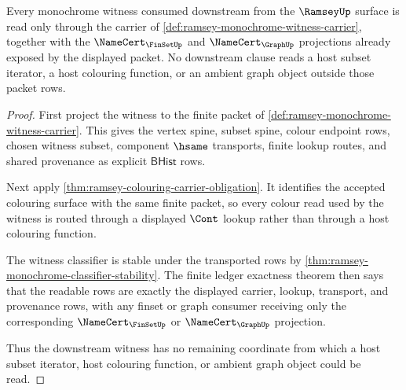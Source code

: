 \begin{theorem}
\label{thm:ramsey-monochrome-witness-scope}
Every monochrome witness consumed downstream from the $\RamseyUp$ surface is
read only through the carrier of
\autoref{def:ramsey-monochrome-witness-carrier}, together with the
$\NameCert_{\FinSetUp}$ and $\NameCert_{\GraphUp}$ projections already exposed
by the displayed packet. No downstream clause reads a host subset iterator, a
host colouring function, or an ambient graph object outside those packet rows.
\end{theorem}
\begin{proof}
First project the witness to the finite packet of
\autoref{def:ramsey-monochrome-witness-carrier}. This gives the vertex spine,
subset spine, colour endpoint rows, chosen witness subset, component
$\hsame$ transports, finite lookup routes, and shared provenance as explicit
$\mathsf{BHist}$ rows.

Next apply \autoref{thm:ramsey-colouring-carrier-obligation}. It identifies
the accepted colouring surface with the same finite packet, so every colour
read used by the witness is routed through a displayed $\Cont$ lookup rather
than through a host colouring function.

The witness classifier is stable under the transported rows by
\autoref{thm:ramsey-monochrome-classifier-stability}. The finite ledger
exactness theorem then says that the readable rows are exactly the displayed
carrier, lookup, transport, and provenance rows, with any finset or graph
consumer receiving only the corresponding $\NameCert_{\FinSetUp}$ or
$\NameCert_{\GraphUp}$ projection.

Thus the downstream witness has no remaining coordinate from which a host
subset iterator, host colouring function, or ambient graph object could be
read.
\end{proof}

